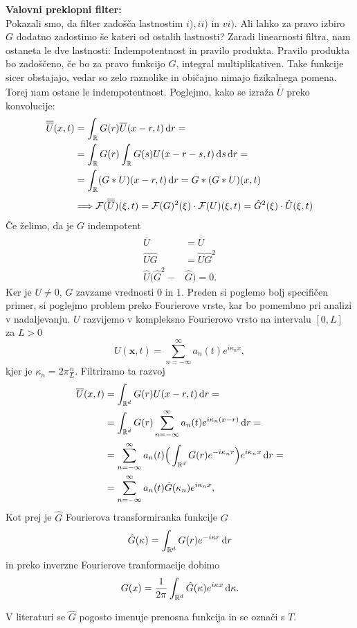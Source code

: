 \documentclass[mat2, tisk]{fmfdelo}
\newcommand{\R}{\mathbb R}
\newcommand{\bd}{\textbf}
\begin{document}
\noindent
\textbf{Valovni preklopni filter:} \\
Pokazali smo, da filter zadošča lastnostim $i), ii)$ in $vi)$. Ali lahko za pravo izbiro 
$G$ dodatno zadostimo še kateri od ostalih lastnosti? Zaradi linearnosti filtra, nam 
ostaneta le dve lastnosti: Indempotentnost in pravilo produkta. Pravilo produkta bo
zadoščeno, če bo za pravo funkcijo $G$, integral multiplikativen. Take funkcije sicer 
obstajajo, vedar so zelo raznolike in običajno nimajo fizikalnega pomena. Torej nam ostane 
le indempotentnost. Poglejmo, kako se izraža $\overline{\overline{{U}}}$ preko konvolucije:
\begin{align*}
\overline{\overline{{U}}}(x, t) &= \int_{\R} G(r) \overline{{U}}(x - r, t) \dif r = \\
&= \int_{\R} G(r) \int_{\R} G(s) {U}(x-r-s, t) \dif s \dif r = \\
&= \int_{\R} (G*{U})(x - r, t) \dif r = G*(G * {U})(x, t) \\[1mm]
&\Longrightarrow \mathcal{F}(\overline{\overline{{U}}})(\xi, t) = \mathcal{F}(G)^2(\xi)\cdot\mathcal{F}({U})(\xi, t) = \hat{G}^2(\xi) \cdot \hat{{U}}(\xi, t)
\end{align*}
Če želimo, da je $G$ indempotent
\begin{align*}
\overline{{U}} &= \overline{\overline{{U}}} \\
\hat{{U}}\hat{G} &= \hat{{U}}\hat{G}^2 \\ 
\hat{U}(\hat{G}^2 - &\hat{G}) = 0.
\end{align*}
Ker je $U \neq 0$, $G$ zavzame vrednosti $0$ in $1$. Preden si poglemo bolj specifičen primer, 
si poglejmo problem preko Fourierove vrste, kar bo pomembno pri analizi v nadaljevanju.
${U}$ razvijemo v kompleksno Fourierovo vrsto na intervalu $[0, L]$ za $L > 0$
\begin{equation}
{U}(\bd{x}, t) = \sum_{n=-\infty}^\infty a_n(t) e^{i\kappa_n x},
\end{equation}
kjer je $\kappa_n = 2\pi\frac{n}{L}$. Filtriramo ta razvoj 
\begin{align*}
\overline{U}(x, t) &= \int_{\R^d} G(r) U(x - r, t) \dif r = \\
&= \int_{\R^d} G(r) \sum_{n=-\infty}^\infty a_n(t) e^{i\kappa_n (x - r)} \dif r = \\
&= \sum_{n=-\infty}^\infty a_n(t)\Big(\int_{\R^d} G(r) e^{-i\kappa_n r}\Big) e^{i\kappa_n x}\dif r = \\
&= \sum_{n=-\infty}^\infty a_n(t) \hat{G}(\kappa_n) e^{i\kappa_n x},
\end{align*}
Kot prej je $\hat{G}$ Fourierova transformiranka funkcije $G$ 
$$
\hat{G}(\kappa) = \int_{\R^d} G(r) e^{-i\kappa r} \dif r
$$
in preko inverzne Fourierove tranformacije dobimo
$$
G(x) = \frac{1}{2\pi} \int_{\R^d} \hat{G}(\kappa) e^{i\kappa x} \dif \kappa.
$$
\begin{opomba}
V literaturi se $\hat{G}$ pogosto imenuje prenosna funkcija in se označi s $T$.
\end{opomba}
\end{document}

